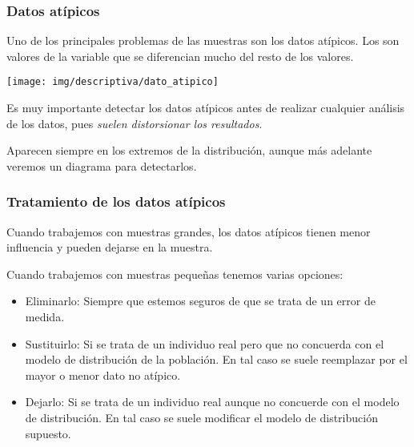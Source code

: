 \begin{frame}
\frametitle{Datos atípicos}
Uno de los principales problemas de las muestras son los datos atípicos. Los  son valores de la variable que se diferencian mucho del resto de los valores. 
\begin{center}
\texttt{[image: img/descriptiva/dato\_atipico]}
\end{center}

Es muy importante detectar los datos atípicos antes de realizar cualquier análisis de los datos, pues \alert{\emph{suelen distorsionar los resultados}}. 

Aparecen siempre en los extremos de la distribución, aunque más adelante veremos un diagrama para detectarlos.

\end{frame}


\begin{frame}
\frametitle{Tratamiento de los datos atípicos}
Cuando trabajemos con muestras grandes, los datos atípicos tienen menor influencia y pueden dejarse en la muestra. 

Cuando trabajemos con muestras pequeñas tenemos varias opciones:
\begin{itemize}
\item Eliminarlo: Siempre que estemos seguros de que se trata de un error de medida.
\item Sustituirlo: Si se trata de un individuo real pero que no concuerda con el modelo de distribución de la población. En tal caso se suele reemplazar por el mayor o menor dato no atípico. 
\item Dejarlo: Si se trata de un individuo real aunque no concuerde con el modelo de distribución. En tal caso se suele modificar el modelo de distribución supuesto. 
\end{itemize}
\end{frame}



